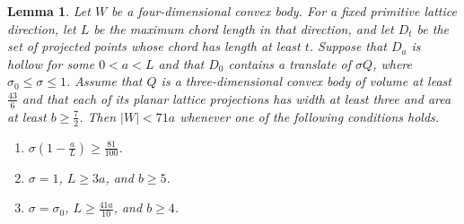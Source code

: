 \documentclass[reqno, 11pt]{article}
\numberwithin{equation}{section}
\newtheorem{lemma}[lemma]{Lemma}
\theoremstyle{definition}
\begin{document}
\begin{lemma}\label{lem:hollow-chord-four}
Let $W$ be a four-dimensional convex body. For a fixed primitive
lattice direction, let $L$ be the maximum chord length in that
direction, and let $D_t$ be the set of projected points whose
chord has length at least $t$. Suppose that $D_a$ is hollow for some
$0<a<L$ and that $D_0$ contains a translate of $\sigma Q$, where
$\sigma_0\le\sigma\le1$. Assume that $Q$ is a three-dimensional convex
body of volume at least $\frac{43}{6}$ and that each of its planar lattice
projections has width at least three and area at least $b\ge\frac{7}{2}$.
Then $|W|<71a$ whenever one of the following conditions holds.
\begin{enumerate}
\item $\sigma(1-\frac{a}{L})\ge\frac{81}{100}$.
\item $\sigma=1$, $L\ge3a$, and $b\ge5$.
\item $\sigma=\sigma_0$, $L\ge\frac{41a}{10}$, and $b\ge4$.
\end{enumerate}
\end{lemma}
\end{document}
